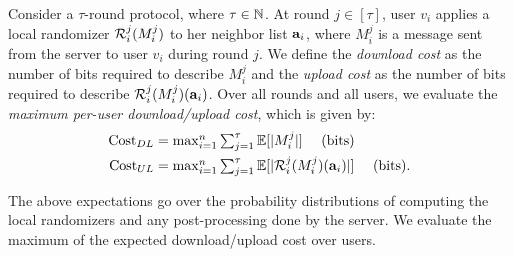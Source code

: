 Consider a $\tau$-round protocol, where $\tau \in \mathbb{N}$. 
At round $j \in [\tau]$, user $v_i$ applies a local randomizer $\mathcal{R}_i^j(M_i^j)$ to her neighbor list $\mathbf{a}_i$, where
$M_i^j$ is a message sent from the server to user $v_i$ during round $j$.
We define the \emph{download cost} 
as 
the number of bits required to describe
$M_i^j$ and the \emph{upload cost} 
as 
the number of bits required to
describe $\mathcal{R}_i^j(M_i^j)(\mathbf{a}_i)$. 
Over all rounds and all users, we evaluate the \textit{maximum per-user download/upload cost}, which is given by:
\begin{align}
  \mathrm{Cost}_{DL} &= \textstyle{\max_{i=1}^n \sum_{j=1}^\tau \mathbb{E}[|M_i^j|] ~~~~ \text{(bits)}} \label{eq:cost_DL}\\
  \mathrm{Cost}_{UL} &= \textstyle{\max_{i=1}^n \sum_{j=1}^\tau \mathbb{E}[|\mathcal{R}_i^j(M_i^j)(\mathbf{a}_i)|]} ~~~~ \text{(bits)}. \label{eq:cost_UL}
\end{align}

The above expectations go over the probability distributions of computing the local
randomizers 
and any post-processing done by the server. 
We evaluate the maximum of the expected download/upload cost over users.